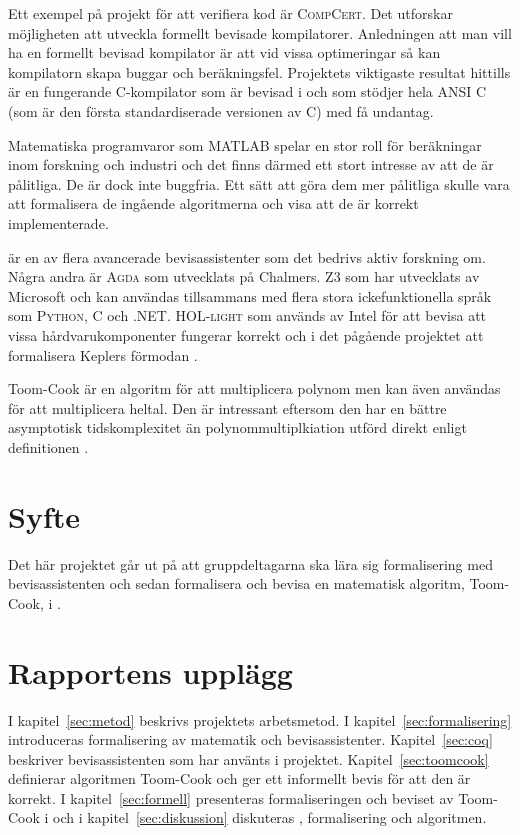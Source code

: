 Ett exempel på projekt för att verifiera kod är \textsc{CompCert}. Det
utforskar möjligheten att utveckla formellt bevisade kompilatorer. Anledningen
att man vill ha en formellt bevisad kompilator är att vid vissa optimeringar så
kan kompilatorn skapa buggar och beräkningsfel. Projektets viktigaste resultat
hittills är en fungerande C-kompilator som är bevisad i \coq{} och som stödjer
hela \textsc{ANSI C} (som är den första standardiserade versionen av
\textsc{C}) med få undantag\cite{compcert}.

Matematiska programvaror som \textsc{MATLAB} spelar en stor roll för
beräkningar inom forskning och industri och det finns därmed ett stort intresse
av att de är pålitliga. De är dock inte buggfria. Ett sätt att göra dem mer
pålitliga skulle vara att formalisera de ingående algoritmerna och visa att de
är korrekt implementerade\cite{denes2012refinement}.

\coq{} är en av flera avancerade bevisassistenter som det bedrivs aktiv
forskning om. Några andra är \textsc{Agda} som utvecklats på Chalmers.
\textsc{Z3} som har utvecklats av Microsoft och kan användas tillsammans med
flera stora ickefunktionella språk som \textsc{Python}, \textsc{C} och
\textsc{.NET}. \textsc{HOL-light} som används av Intel för att bevisa att vissa
hårdvarukomponenter fungerar korrekt och i det pågående projektet att
formalisera Keplers förmodan \cite{hales2008formal}.

Toom-Cook är en algoritm för att multiplicera polynom men kan även användas
för att multiplicera heltal. Den är intressant eftersom den har en bättre
asymptotisk tidskomplexitet än polynommultiplkiation utförd direkt enligt
definitionen .

\section{Syfte}
Det här projektet går ut på att gruppdeltagarna ska lära sig formalisering med
bevisassistenten \coq{} och sedan formalisera och bevisa en matematisk algoritm,
Toom-Cook, i \coq{}.

\section{Rapportens upplägg}
I kapitel~\ref{sec:metod} beskrivs projektets arbetsmetod. I
kapitel~\ref{sec:formalisering} introduceras formalisering av matematik och
bevisassistenter. Kapitel~\ref{sec:coq} beskriver bevisassistenten \coq{} som har
använts i projektet. Kapitel~\ref{sec:toomcook} definierar algoritmen Toom-Cook och
ger ett informellt bevis för att den är korrekt. I kapitel~\ref{sec:formell}
presenteras formaliseringen och beviset av Toom-Cook i \coq{} och i
kapitel~\ref{sec:diskussion} diskuteras \coq{}, formalisering och algoritmen.

